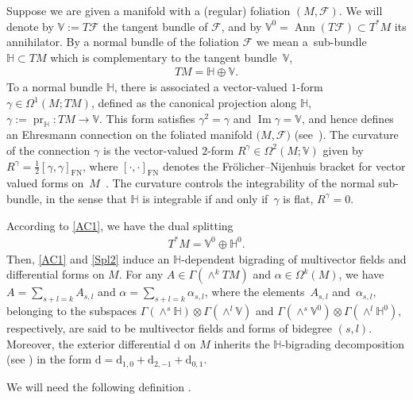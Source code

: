 \documentclass[10pt,a4paper]{amsart}
\numberwithin{equation}{section}
\begin{document}
Suppose we are given a manifold with a (regular) foliation $(M,\mathcal{F})$. We will denote by $\mathbb{V}:=T\mathcal{F}$ the tangent bundle of $\mathcal{F}$, and by $\mathbb{V}^{0}=\operatorname*{Ann}(T\mathcal{F})\subset T^{\ast}M$ its annihilator. By a normal bundle of the foliation $\mathcal{F}$ we mean a~sub-bundle $\mathbb{H}\subset TM$ which is complementary to the tangent bundle~$\mathbb{V}$,
\begin{gather}
TM=\mathbb{H}\oplus\mathbb{V}.\label{AC1}
\end{gather}
To a normal bundle $\mathbb{H}$, there is associated a vector-valued $1$-form $\gamma\in\Omega^{1}(M;TM)$, def\/ined as the canonical projection along $\mathbb{H}$, $\gamma := \operatorname{pr}_{\mathbb{H}}\colon TM\rightarrow\mathbb{V}$. This form satisf\/ies $\gamma^{2}=\gamma$ and $\operatorname{Im}\gamma=\mathbb{V}$, and hence def\/ines an Ehresmann connection on the foliated manifold $(M,\mathcal{F)}$ (see~\cite{KMS-93}). The curvature of the connection $\gamma$ is the vector-valued $2$-form $R^{\gamma}\in\Omega^{2}(M;\mathbb{V})$ given by $R^{\gamma}=\frac{1}{2}[\gamma,\gamma]_{\operatorname*{FN}}$, where $[\cdot ,\cdot ]_{\operatorname*{FN}}$ denotes the Fr\"{o}licher--Nijenhuis bracket for vector valued forms on~$M$~\cite{KMS-93}. The curvature controls the integrability of the normal sub-bundle, in the sense that $\mathbb{H}$ is integrable if and only if~$\gamma$ is f\/lat, $R^{\gamma}=0$.

According to \eqref{AC1}, we have the dual splitting
\begin{gather}
T^{\ast}M=\mathbb{V}^{0}\oplus\mathbb{H}^{0}. \label{Spl2}
\end{gather}
Then, \eqref{AC1} and \eqref{Spl2} induce an $\mathbb{H}$-dependent bigrading of multivector f\/ields and dif\/ferential forms on $M$. For any $A\in
\Gamma(\wedge^{k}TM)$ and $\alpha\in\Omega^{k}(M)$, we have $A=\sum\limits _{s+l=k}A_{s,l}$ and $\alpha=\sum\limits_{s+l=k}\alpha_{s,l}$, where the elements~$A_{s,l}$ and~$\alpha_{s,l}$, belonging to the subspaces $\Gamma(\wedge^{s}\mathbb{H})\otimes\Gamma(\wedge^{l}\mathbb{V})$ and $\Gamma(\wedge ^{s}\mathbb{V}^{0})\otimes\Gamma(\wedge^{l}\mathbb{H}^{0})$, respectively, are said to be multivector f\/ields and forms of bidegree $(s,l)$. Moreover, the exterior dif\/ferential $\mathrm{d}$ on $M$ inherits the $\mathbb{H}$-bigrading decomposition (see \cite{Va-04}) in the form
$\mathrm{d}=\mathrm{d}_{1,0}+\mathrm{d}_{2,-1}+\mathrm{d}_{0,1}$.

We will need the following def\/inition \cite{Va-04, Vo-01}.
\end{document}
